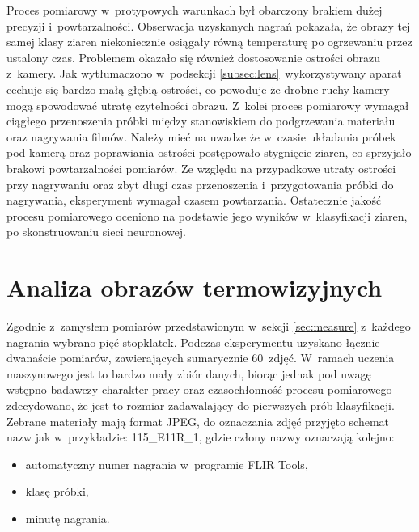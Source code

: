 Proces pomiarowy w~protypowych warunkach był obarczony brakiem dużej precyzji
i~powtarzalności.
Obserwacja uzyskanych nagrań pokazała, że obrazy tej samej klasy ziaren
niekoniecznie osiągały równą temperaturę po ogrzewaniu przez ustalony czas.
Problemem okazało się również dostosowanie ostrości obrazu z~kamery.
Jak wytłumaczono w~podsekcji \ref{subsec:lens}~wykorzystywany aparat cechuje
się bardzo małą głębią ostrości, co powoduje że drobne ruchy kamery
mogą spowodować utratę czytelności obrazu.
Z~kolei proces pomiarowy wymagał ciągłego przenoszenia próbki między
stanowiskiem do podgrzewania materiału oraz nagrywania filmów.
Należy mieć na uwadze że w~czasie układania próbek pod kamerą oraz poprawiania
ostrości postępowało stygnięcie ziaren, co sprzyjało brakowi powtarzalności
pomiarów.
Ze względu na przypadkowe utraty ostrości przy nagrywaniu oraz zbyt długi czas
przenoszenia i~przygotowania próbki do nagrywania, eksperyment wymagał czasem
powtarzania.
Ostatecznie jakość procesu pomiarowego oceniono na podstawie jego wyników
w~klasyfikacji ziaren, po skonstruowaniu sieci neuronowej.

\section{Analiza obrazów termowizyjnych}
Zgodnie z~zamysłem pomiarów przedstawionym w~sekcji \ref{sec:measure}
z~każdego nagrania wybrano pięć stopklatek.
Podczas eksperymentu uzyskano łącznie dwanaście pomiarów, zawierających
sumarycznie 60~zdjęć.
W~ramach uczenia maszynowego jest to bardzo mały zbiór danych, biorąc jednak
pod uwagę wstępno-badawczy charakter pracy oraz czasochłonność procesu
pomiarowego zdecydowano, że jest to rozmiar zadawalający do pierwszych
prób klasyfikacji.
Zebrane materiały mają format JPEG, do oznaczania zdjęć przyjęto schemat
nazw jak w~przykładzie: 115\_E11R\_1, gdzie człony nazwy oznaczają kolejno:
\begin{itemize}
	\item automatyczny numer nagrania w~programie FLIR Tools,
	\item klasę próbki,
	\item minutę nagrania.
\end{itemize}

